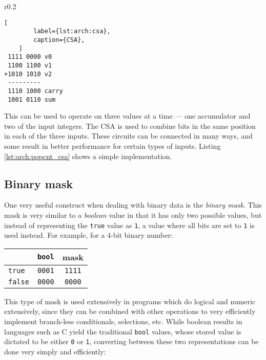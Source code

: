 \begin{wrapfigure}{r}{0.2\textwidth}
    \vspace{-2\baselineskip}
    \begin{lstlisting}[
        label={lst:arch:csa},
        caption={CSA},
    ]
 1111 0000 v0
 1100 1100 v1
+1010 1010 v2
 ---------
 1110 1000 carry
 1001 0110 sum
    \end{lstlisting}
\end{wrapfigure}

This can be used to operate on three values at a time --- one accumulator and
two of the input integers.  The CSA is used to combine bits in the same position
in each of the three inputs.  These circuits can be connected in many ways, and
some result in better performance for certain types of inputs.  Listing
\ref{lst:arch:popcnt_csa} shows a simple implementation.

\begin{figure}[ht]
    \vspace{-\baselineskip}
    
    \vspace{-\baselineskip}
\end{figure}

\subsection{Binary mask}

One very useful construct when dealing with binary data is the \textit{binary
mask}.  This mask is very similar to a \textit{boolean} value in that it has
only two possible values, but instead of representing the \texttt{true} value as
\texttt{1}, a value where all bits are set to \texttt{1} is used instead.  For
example, for a 4-bit binary number:

\begin{center}
    \begin{tabular}{l|cc}
        & \texttt{bool} & mask \\
        \hline
        \texttt{true}  & \texttt{0001} & \texttt{1111} \\
        \texttt{false} & \texttt{0000} & \texttt{0000} \\
    \end{tabular}
\end{center}

This type of mask is used extensively in programs which do logical and numeric
extensively, since they can be combined with other operations to very
efficiently implement branch-less conditionals, selections, etc.  While boolean
results in languages such as C yield the traditional \texttt{bool} values, whose
stored value is dictated to be either \texttt{0} or \texttt{1}, converting
between these two representations can be done very simply and
efficiently\footnotemark:

